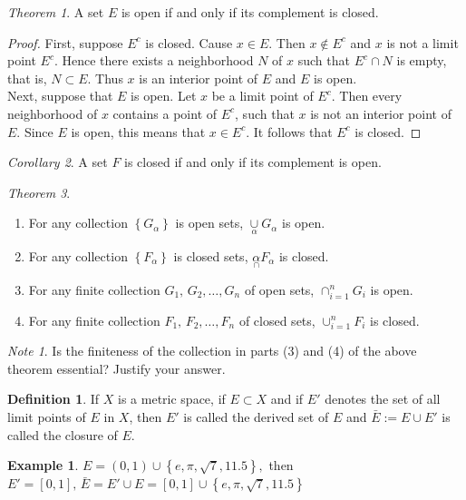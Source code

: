 \documentclass[12pt,oneside,a4paper]{book}
\newcommand{\xn}[2]{{#1}_1{#2}\,{#1}_2{#2}\dots{#2}{#1}_n}
\newcommand{\set}[1]{\left\{#1\right\}}
\theoremstyle{remark}
\newtheorem* {note}{Note}
\newtheorem{thm}{Theorem}[section]
\newtheorem{cor}[thm]{Corollary}
\theoremstyle{definition}
\newtheorem{defn}{Definition}[section]
\newtheorem*{ex}{Example}
\begin{document}
\begin{thm}
    A set $ E $ is open if and only if its complement is closed.
\end{thm}
\begin{proof}
    First, suppose $ E^c $ is closed. Cause $ x\in E $. Then $ x\notin E^c $ and $ x $ is not a limit point $ E^c $. Hence there exists a neighborhood $ N $ of $ x $ such that $ E^c \cap N $ is empty, that is, $ N\subset E $. Thus $ x $ is an interior point of $ E $ and $ E $ is open.\\
    
    Next, suppose that $ E $ is open. Let $ x $ be a limit point of $ E^c $. Then every neighborhood of $ x $ contains a point of $ E^c $, such that $ x $ is not an interior point of $ E $. Since $ E $ is open, this means that $ x\in E^c $. It follows that $ E^c $ is closed.
\end{proof}
\begin{cor}
    A set $ F $ is closed if and only if its complement is open.
\end{cor}
\begin{thm}
    \begin{enumerate}
        \item For any collection $ \set{G_\alpha} $ is open sets, $ \underset{\alpha}{\cup} G_\alpha$ is open.
        \item For any collection $ \set{F_\alpha} $ is closed sets, $ \underset{\cap}{\alpha} F_\alpha$ is closed.
        \item For any finite collection $ \xn{G}{,} $ of open sets, $ \cap_{i=1}^{n} G_i $ is open.
        \item For any finite collection $ \xn{F}{,} $ of closed sets, $ \cup_{i=1}^{n} F_i $ is closed.
    \end{enumerate}
\end{thm}
\begin{note}
    Is the finiteness of the collection in parts (3) and (4) of the above theorem essential? Justify your answer.
\end{note}
\begin{defn}
    If $ X $ is a metric space, if $ E\subset X $ and if $ E' $ denotes the set of all limit points of $ E $ in $ X $, then $ E' $ is called the derived set of $ E $ and $ \bar{E}:=E\cup E' $ is called the closure of $ E $.
\end{defn}
\begin{ex}
    $ E=(0,1)\cup \set{e,\pi,\sqrt{7},11.5}, $ then $ E'=[0,1],\, \bar{E}=E'\cup E=[0,1]\cup  \set{e,\pi,\sqrt{7},11.5}$
\end{ex}
\end{document}
